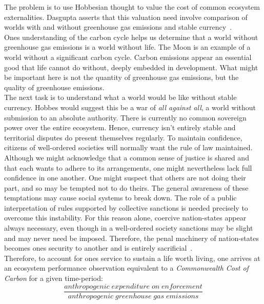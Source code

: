 \documentclass[11pt, oneside]{article}   	%
\begin{document}
The problem is to use Hobbesian thought to value the cost of common ecosystem externalities.
Dasgupta asserts that this valuation need involve comparison of worlds with and without greenhouse gas emissions and stable currency~\cite{pd2}.\\

Ones understanding of the carbon cycle helps us determine that a world without greenhouse gas emissions is a world without life.
The Moon is an example of a world without a significant carbon cycle.
Carbon emissions appear an essential good that life cannot do without, deeply embedded in development.
What might be important here is not the quantity of greenhouse gas emissions, but the quality of greenhouse emissions.\\

The next task is to understand what a world would be like without stable currency.
Hobbes would suggest this be a war of \emph{all against all}, a world without submission to an absolute authority.
There is currently no common sovereign power over the entire ecosystem.
Hence, currency isn't entirely stable and territorial disputes do present themselves regularly.
To maintain confidence, citizens of well-ordered societies will normally want the rule of law maintained.
Although we might acknowledge that a common sense of justice is shared and that each wants to adhere to its arrangements, one might nevertheless lack full confidence in one another.
One might suspect that others are not doing their part, and so may be tempted not to do theirs.
The general awareness of these temptations may cause social systems to break down.
The role of a public interpretation of rules supported by collective sanctions is needed precisely to overcome this instability.
For this reason alone, coercive nation-states appear always necessary, even though in a well-ordered society sanctions may be slight and may never need be imposed.
Therefore, the penal machinery of nation-states becomes ones security to another and is entirely sacrificial~\cite{jr1}.\\

Therefore, to account for ones service to sustain a life worth living, one arrives at an ecosystem performance observation equivalent to a \emph{Commonwealth Cost of Carbon} for a given time-period:\\

\begin{equation}
	\frac{anthropogenic\; expenditure\; on\; enforcement}{anthropogenic\; greenhouse\; gas\; emissions}
\end{equation}\\
\end{document}
